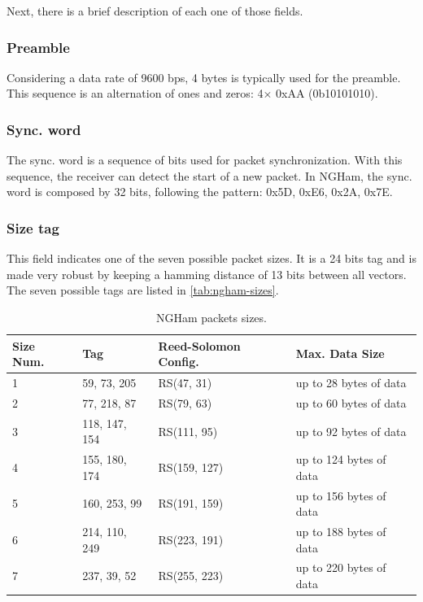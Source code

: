 Next, there is a brief description of each one of those fields.

\subsubsection{Preamble}

Considering a data rate of 9600 bps, 4 bytes is typically used for the preamble. This sequence is an alternation of ones and zeros: 4$\times$ 0xAA (0b10101010).

\subsubsection{Sync. word}

The sync. word is a sequence of bits used for packet synchronization. With this sequence, the receiver can detect the start of a new packet. In NGHam, the sync. word is composed by 32 bits, following the pattern: 0x5D, 0xE6, 0x2A, 0x7E.

\subsubsection{Size tag}

This field indicates one of the seven possible packet sizes. It is a 24 bits tag and is made very robust by keeping a hamming distance of 13 bits between all vectors. The seven possible tags are listed in \autoref{tab:ngham-sizes}.

\begin{table}[!h]
    \centering
    \begin{tabular}{llll}
        \toprule[1.5pt]
        \textbf{Size Num.} & \textbf{Tag} & \textbf{Reed-Solomon Config.} & \textbf{Max. Data Size} \\
        \midrule
        1 & 59, 73, 205   & RS(47, 31)   & up to 28 bytes of data \\
        2 & 77, 218, 87   & RS(79, 63)   & up to 60 bytes of data \\
        3 & 118, 147, 154 & RS(111, 95)  & up to 92 bytes of data \\
        4 & 155, 180, 174 & RS(159, 127) & up to 124 bytes of data \\
        5 & 160, 253, 99  & RS(191, 159) & up to 156 bytes of data \\
        6 & 214, 110, 249 & RS(223, 191) & up to 188 bytes of data \\
        7 & 237, 39, 52   & RS(255, 223) & up to 220 bytes of data \\
        \bottomrule[1.5pt]
    \end{tabular}
    \caption{NGHam packets sizes.}
    \label{tab:ngham-sizes}
\end{table}

